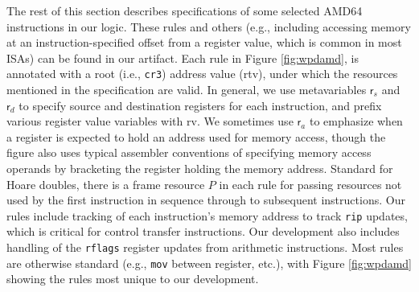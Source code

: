 The rest of this section describes specifications of some selected \textsf{AMD64} instructions 
in our logic. 
These rules and others (e.g., including accessing memory at an instruction-specified offset from a register
value, which is common in most ISAs)
can be found in our artifact.
Each rule in Figure \ref{fig:wpdamd}, 
is annotated with a root (i.e., \lstinline|cr3|) address value (\textsf{rtv}), 
under which the resources mentioned in the specification are valid.
In general, we use metavariables $\textsf{r}_s$ and $\textsf{r}_d$ to specify source and destination registers
for each instruction, and prefix various register value variables with \textsf{rv}.
We sometimes use $\textsf{r}_a$ to emphasize when a register is expected to hold an address used
for memory access, though the figure also uses typical assembler conventions of specifying
memory access operands by bracketing the register holding the memory address.
Standard for Hoare doubles, there is a frame resource $P$ in each rule for passing resources
not used by the first instruction in sequence through to subsequent instructions.
Our rules include tracking of each instruction's memory address to track \lstinline|rip| updates, which is critical
for control transfer instructions. Our development also includes handling of the \lstinline|rflags| register updates from arithmetic instructions.
Most rules are otherwise standard (e.g., \lstinline|mov| between register, etc.), with Figure \ref{fig:wpdamd} showing the rules
most unique to our development.

